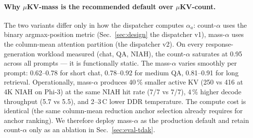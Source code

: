\documentclass[sigconf, anonymous=false, screen=true]{acmart}
\begin{document}
\paragraph{Why $\mu$KV-mass is the recommended default over $\mu$KV-count.} The two variants differ only in how the dispatcher computes $\alpha_a$: count-$\alpha$ uses the binary argmax-position metric (Sec.~\ref{sec:design} the dispatcher v1), mass-$\alpha$ uses the column-mean attention partition (the dispatcher v2). On every response-generation workload measured (chat, QA, NIAH), the count-$\alpha$ saturates at 0.95 across all prompts --- it is functionally static. The mass-$\alpha$ varies smoothly per prompt: 0.62--0.78 for short chat, 0.78--0.92 for medium QA, 0.81--0.91 for long retrieval. Operationally, mass-$\alpha$ produces 40\,\% smaller active KV (250 vs 416 at 4K NIAH on Phi-3) at the same NIAH hit rate (7/7 vs 7/7), 4\,\% higher decode throughput (5.7 vs 5.5), and 2--3\,\textdegree C lower DDR temperature. The compute cost is identical (the same column-mean reduction anchor selection already requires for anchor ranking). We therefore deploy mass-$\alpha$ as the production default and retain count-$\alpha$ only as an ablation in Sec.~\ref{sec:eval-tdak}.
\end{document}
